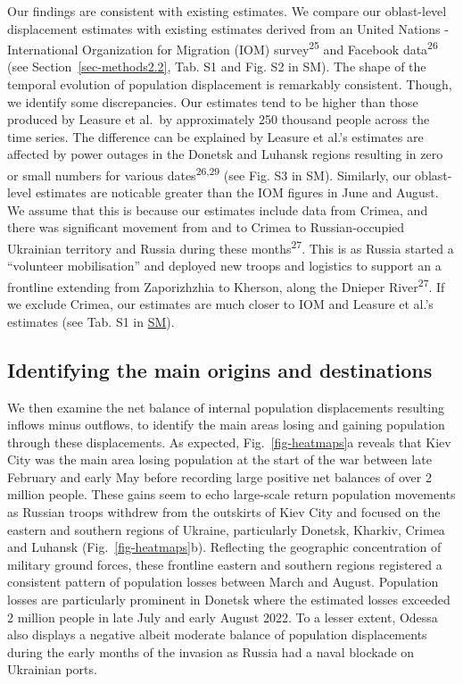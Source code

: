 \documentclass[
  11pt,
]{article}
\begin{document}
Our findings are consistent with existing estimates. We compare our
oblast-level displacement estimates with existing estimates derived from
an United Nations - International Organization for Migration (IOM)
survey\textsuperscript{25} and Facebook data\textsuperscript{26} (see
Section~\ref{sec-methods2.2}, Tab. S1 and Fig. S2 in SM). The shape of
the temporal evolution of population displacement is remarkably
consistent. Though, we identify some discrepancies. Our estimates tend
to be higher than those produced by Leasure et al.~by approximately 250
thousand people across the time series. The difference can be explained
by Leasure et al.'s estimates are affected by power outages in the
Donetsk and Luhansk regions resulting in zero or small numbers for
various dates\textsuperscript{26,29} (see Fig. S3 in SM). Similarly, our
oblast-level estimates are noticable greater than the IOM figures in
June and August. We assume that this is because our estimates include
data from Crimea, and there was significant movement from and to Crimea
to Russian-occupied Ukrainian territory and Russia during these
months\textsuperscript{27}. This is as Russia started a ``volunteer
mobilisation'' and deployed new troops and logistics to support an a
frontline extending from Zaporizhzhia to Kherson, along the Dnieper
River\textsuperscript{27}. If we exclude Crimea, our estimates are much
closer to IOM and Leasure et al.'s estimates (see Tab. S1 in
\href{https://github.com/fcorowe/ukraine-pop-displacement/blob/main/manuscript/quarto-file-supplementary.pdf}{SM}).

\subsection{Identifying the main origins and
destinations}\label{sec-odm}

We then examine the net balance of internal population displacements
resulting inflows minus outflows, to identify the main areas losing and
gaining population through these displacements. As expected,
Fig.~\ref{fig-heatmaps}a reveals that Kiev City was the main area losing
population at the start of the war between late February and early May
before recording large positive net balances of over 2 million people.
These gains seem to echo large-scale return population movements as
Russian troops withdrew from the outskirts of Kiev City and focused on
the eastern and southern regions of Ukraine, particularly Donetsk,
Kharkiv, Crimea and Luhansk (Fig.~\ref{fig-heatmaps}b). Reflecting the
geographic concentration of military ground forces, these frontline
eastern and southern regions registered a consistent pattern of
population losses between March and August. Population losses are
particularly prominent in Donetsk where the estimated losses exceeded 2
million people in late July and early August 2022. To a lesser extent,
Odessa also displays a negative albeit moderate balance of population
displacements during the early months of the invasion as Russia had a
naval blockade on Ukrainian ports.
\end{document}
